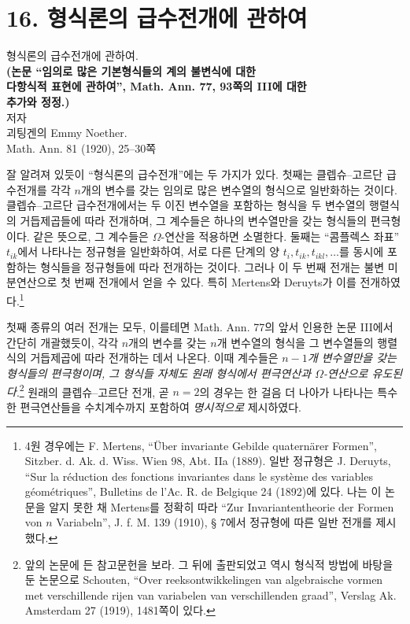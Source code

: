 
\section*{16. 형식론의 급수전개에 관하여}
\begin{center}
{\large 형식론의 급수전개에 관하여.}\\[0.5em]
\textbf{(논문 ``임의로 많은 기본형식들의 계의 불변식에 대한\\
다항식적 표현에 관하여'', Math. Ann. 77, 93쪽의 III에 대한\\
추가와 정정.)}\\[0.65em]
저자\\[0.25em]
괴팅겐의 Emmy Noether.\\[0.65em]
Math. Ann. 81 (1920), 25--30쪽
\end{center}

잘 알려져 있듯이 ``형식론의 급수전개''에는 두 가지가 있다. 첫째는 클렙슈--고르단 급수전개를 각각 \(n\)개의 변수를 갖는 임의로 많은 변수열의 형식으로 일반화하는 것이다. 클렙슈--고르단 급수전개에서는 두 이진 변수열을 포함하는 형식을 두 변수열의 행렬식의 거듭제곱들에 따라 전개하며, 그 계수들은 하나의 변수열만을 갖는 형식들의 편극형이다. 같은 뜻으로, 그 계수들은 \(\Omega\)-연산을 적용하면 소멸한다. 둘째는 ``콤플렉스 좌표'' \(t_{ik}\)에서 나타나는 정규형을 일반화하여, 서로 다른 단계의 양 \(t_i,t_{ik},t_{ikl},\ldots\)를 동시에 포함하는 형식들을 정규형들에 따라 전개하는 것이다. 그러나 이 두 번째 전개는 불변 미분연산으로 첫 번째 전개에서 얻을 수 있다. 특히 Mertens와 Deruyts가 이를 전개하였다.\footnote{4원 경우에는 F. Mertens, ``Über invariante Gebilde quaternärer Formen'', Sitzber. d. Ak. d. Wiss. Wien 98, Abt. IIa (1889). 일반 정규형은 J. Deruyts, ``Sur la réduction des fonctions invariantes dans le système des variables géométriques'', Bulletins de l'Ac. R. de Belgique 24 (1892)에 있다. 나는 이 논문을 알지 못한 채 Mertens를 정확히 따라 ``Zur Invariantentheorie der Formen von \(n\) Variabeln'', J. f. M. 139 (1910), § 7에서 정규형에 따른 일반 전개를 제시했다.}

첫째 종류의 여러 전개는 모두, 이를테면 Math. Ann. 77의 앞서 인용한 논문 III에서 간단히 개괄했듯이, 각각 \(n\)개의 변수를 갖는 \(n\)개 변수열의 형식을 그 변수열들의 행렬식의 거듭제곱에 따라 전개하는 데서 나온다. 이때 계수들은 \emph{\(n-1\)개 변수열만을 갖는 형식들의 편극형이며, 그 형식들 자체도 원래 형식에서 편극연산과 \(\Omega\)-연산으로 유도된다}.\footnote{앞의 논문에 든 참고문헌을 보라. 그 뒤에 출판되었고 역시 형식적 방법에 바탕을 둔 논문으로 Schouten, ``Over reeksontwikkelingen van algebraische vormen met verschillende rijen van variabelen van verschillenden graad'', Verslag Ak. Amsterdam 27 (1919), 1481쪽이 있다.} 원래의 클렙슈--고르단 전개, 곧 \(n=2\)의 경우는 한 걸음 더 나아가 나타나는 특수한 편극연산들을 수치계수까지 포함하여 \emph{명시적으로} 제시하였다.

